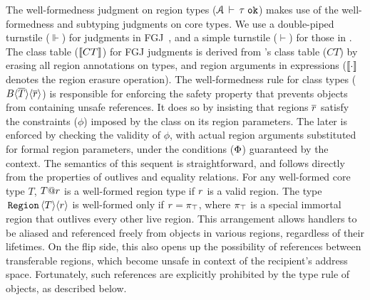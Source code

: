 \noindent The well-formedness judgment on region types
(${\mathcal{A}}\,\vdash\,\tau \; \texttt{ok}$) makes use of the well-formedness and subtyping
judgments on core types. We use a double-piped turnstile ($\Vdash$)
for judgments in FGJ~\cite{fgj}, and a simple turnstile ($\vdash$) for
those in \FB. The class table ($\llbracket CT \rrbracket$) for FGJ judgments is
derived from \FB's class table ($CT$) by erasing all region
annotations on types, and region arguments in expressions
($\llbracket \cdot \rrbracket$ denotes the region erasure operation). 
The well-formedness rule for class types
($B\langle \overline{T} \rangle\langle \overline{r} \rangle$) is responsible for enforcing the
safety property that prevents objects from containing unsafe
references. It does so by insisting that regions $\overline{r}$ satisfy the
constraints ($\phi$) imposed by the class on its region parameters.
The later is enforced by checking the validity of $\phi$, with actual
region arguments substituted for formal region parameters, under the
conditions ($\Phi$) guaranteed by the context. The semantics of this
sequent is straightforward, and follows directly from the properties
of outlives and equality relations. For any well-formed core type $T$,
$T@r$ is a well-formed region type if $r$ is a valid region.
The type $\,{\tt Region}\,\langle T \rangle\langle r \rangle$ is well-formed only if $r = \pi_{\top}$, where
$\pi_{\top}$ is a special immortal region that outlives every other live
region. This arrangement allows \C{\RgnZ} handlers to be aliased and
referenced freely from objects in various regions, regardless of their
lifetimes. On the flip side, this also opens up the possibility of
references between transferable regions, which become unsafe in
context of the recipient's address space. Fortunately, such references
are explicitly prohibited by the type rule of \C{\RgnZ} objects, as
described below.




